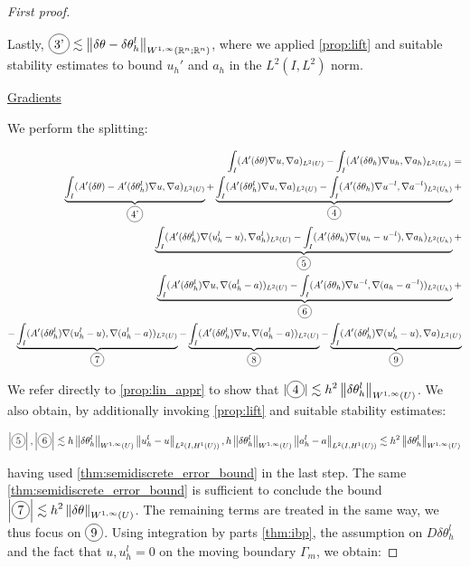 \documentclass[english,a4paper,9pt,oneside]{scrbook}	%
\theoremstyle{break}
\newenvironment{mproof}[1][\proofname]{%
  \begin{proof}[#1]$ $\par\nobreak\ignorespaces
}{%
  \end{proof}
}
\renewcommand*{\proofname}{Proof}
\theoremstyle{remark}
\newcommand{\mR}{\mathbb{R}}
\newcommand{\ds}{\displaystyle}
\newcommand{\norm}[1]{\left\lVert#1\right\rVert}
\newcommand{\te}{\theta}
\newcommand*\circled[1]{\tikz[baseline=(char.base)]{
            \node[shape=circle,draw,inner sep=2pt] (char) {#1};}}
\begin{document}
\begin{mproof}[First proof]
Lastly, $\circled{3'}\ds \lesssim \norm{\delta \te - \delta \te_h^l}_{W^{1,\infty}(\mR^n; \mR^n)}$, where we applied \cref{prop:lift} and suitable stability estimates to bound $u_h'$ and $a_h$ in the $L^2(I,L^2)$ norm.


\underline{Gradients}

We perform the splitting:

\begin{align*}
	\int_I (A'(\delta\te )\nabla u, \nabla a)_{L^2(U)}-\int_I (A'(\delta\te_h )\nabla u_h, \nabla a_h)_{L^2(U_h)} = \\
	\underbrace{\int_I (A'(\delta\te )-A'(\delta \te_h^l) \nabla u, \nabla a)_{L^2(U)}}_{\circled{4'}}+\underbrace{\int_I (A'(\delta\te_h^l)\nabla u, \nabla a)_{L^2(U)} - \int_I (A'(\delta\te_h )\nabla u^{-l}, \nabla a^{-l})_{L^2(U_h)}}_{\circled{4}}+\\
	\underbrace{\int_I (A'(\delta\te_h^l )\nabla (u_h^l-u), \nabla a_h^l)_{L^2(U)} - \int_I (A'(\delta\te_h )\nabla (u_h - u^{-l}), \nabla a_h)_{L^2(U_h)}}_{\circled{5}}+\\
	\underbrace{\int_I (A'(\delta\te_h^l )\nabla u, \nabla (a_h^l-a))_{L^2(U)} - \int_I (A'(\delta\te_h )\nabla u^{-l}, \nabla (a_h-a^{-l}))_{L^2(U_h)}}_{\circled{6}}+\\
	- \underbrace{\int_I (A'(\delta\te_h^l )\nabla (u_h^l-u), \nabla (a_h^l-a))_{L^2(U)}}_{\circled{7}}
	- \underbrace{\int_I (A'(\delta\te_h^l )\nabla u, \nabla (a_h^l-a))_{L^2(U)}}_{\circled{8}}
	- \underbrace{\int_I (A'(\delta\te_h^l )\nabla (u_h^l-u), \nabla a)_{L^2(U)}}_{\circled{9}}
\end{align*}

We refer directly to \cref{prop:lin_appr} to show that $\ds |\circled{4}|\lesssim h^2\norm{\delta \te_h^l}_{W^{1,\infty}(U)}$. We also obtain, by additionally invoking \cref{prop:lift} and suitable stability estimates:

\begin{align*}
	\left | \circled{5} \right |, \left | \circled{6} \right |\lesssim h \norm{\delta \te_h^l}_{W^{1,\infty}(U)} \norm{u_h^l-u}_{L^2(I,H^1(U))},  h \norm{\delta \te_h^l}_{W^{1,\infty}(U)} \norm{a_h^l-a}_{L^2(I,H^1(U))}\lesssim h^2 \norm{\delta \te_h^l}_{W^{1,\infty}(U)}
\end{align*}

having used \cref{thm:semidiscrete_error_bound} in the last step. The same \cref{thm:semidiscrete_error_bound} is sufficient to conclude the bound $\ds \left | \circled{7} \right | \lesssim h^2 \norm{\delta \te}_{W^{1,\infty}(U)}$. The remaining terms are treated in the same way, we thus focus on $\circled{9}$. Using integration by parts \cref{thm:ibp}, the assumption on $D\delta \te_h^l$ and the fact that $u, u^l_h=0$ on the moving boundary $\Gamma_m$, we obtain:


\end{mproof}
\end{document}
